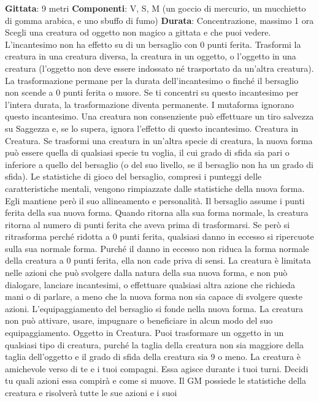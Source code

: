 \begin{multicols}{2}
\textbf{Gittata}: 9 metri
\textbf{Componenti}: V, S, M (un goccio di mercurio, un
mucchietto di gomma arabica, e uno sbuffo di fumo)
\textbf{Durata}: Concentrazione, massimo 1 ora
Scegli una creatura od oggetto non magico a gittata e
che puoi vedere. L’incantesimo non ha effetto su di un
bersaglio con 0 punti ferita. Trasformi la creatura in una
creatura diversa, la creatura in un oggetto, o l’oggetto in
una creatura (l’oggetto non deve essere indossato né
trasportato da un’altra creatura). La trasformazione
permane per la durata dell’incantesimo o finché il
bersaglio non scende a 0 punti ferita o muore. Se ti
concentri su questo incantesimo per l’intera durata, la
trasformazione diventa permanente.
I mutaforma ignorano questo incantesimo. Una creatura
non consenziente può effettuare un tiro salvezza su
Saggezza e, se lo supera, ignora l’effetto di questo
incantesimo.
Creatura in Creatura. Se trasformi una creatura in
un’altra specie di creatura, la nuova forma può essere
quella di qualsiasi specie tu voglia, il cui grado di sfida
sia pari o inferiore a quello del bersaglio (o del suo
livello, se il bersaglio non ha un grado di sfida). Le
statistiche di gioco del bersaglio, compresi i punteggi
delle caratteristiche mentali, vengono rimpiazzate dalle
statistiche della nuova forma. Egli mantiene però il suo
allineamento e personalità.
Il bersaglio assume i punti ferita della sua nuova forma.
Quando ritorna alla sua forma normale, la creatura
ritorna al numero di punti ferita che aveva prima di
trasformarsi. Se però si ritrasforma perché ridotta a 0
punti ferita, qualsiasi danno in eccesso si ripercuote
sulla sua normale forma. Purché il danno in eccesso
non riduca la forma normale della creatura a 0 punti
ferita, ella non cade priva di sensi.
La creatura è limitata nelle azioni che può svolgere
dalla natura della sua nuova forma, e non può
dialogare, lanciare incantesimi, o effettuare qualsiasi
altra azione che richieda mani o di parlare, a meno che
la nuova forma non sia capace di svolgere queste
azioni.
L’equipaggiamento del bersaglio si fonde nella nuova
forma. La creatura non può attivare, usare, impugnare o
beneficiare in alcun modo del suo equipaggiamento.
Oggetto in Creatura. Puoi trasformare un oggetto in un
qualsiasi tipo di creatura, purché la taglia della creatura
non sia maggiore della taglia dell’oggetto e il grado di
sfida della creatura sia 9 o meno. La creatura è
amichevole verso di te e i tuoi compagni. Essa agisce
durante i tuoi turni. Decidi tu quali azioni essa compirà e
come si muove. Il GM possiede le statistiche della
creatura e risolverà tutte le sue azioni e i suoi

\end{multicols}

